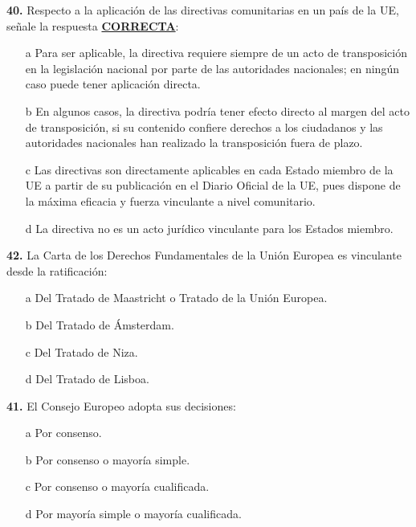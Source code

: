 \documentclass{nuevotema}
\begin{document}
\preguntas


\textbf{40.} Respecto a la aplicación de las directivas comunitarias en un país de la UE, señale la respuesta \underline{\textbf{CORRECTA}}:

\begin{itemize}
	\item[a] Para ser aplicable, la directiva requiere siempre de un acto de transposición en la legislación nacional por parte de las autoridades nacionales; en ningún caso puede tener aplicación directa.
	\item[b] En algunos casos, la directiva podría tener efecto directo al margen del acto de transposición, si su contenido confiere derechos a los ciudadanos y las autoridades nacionales han realizado la transposición fuera de plazo.
	\item[c] Las directivas son directamente aplicables en cada Estado miembro de la UE a partir de su publicación en el Diario Oficial de la UE, pues dispone de la máxima eficacia y fuerza vinculante a nivel comunitario.
	\item[d] La directiva no es un acto jurídico vinculante para los Estados miembro.
\end{itemize}

\bigskip
\textbf{42.} La Carta de los Derechos Fundamentales de la Unión Europea es vinculante desde la ratificación:

\begin{itemize}
	\item[a] Del Tratado de Maastricht o Tratado de la Unión Europea.
	\item[b] Del Tratado de Ámsterdam.
	\item[c] Del Tratado de Niza.
	\item[d] Del Tratado de Lisboa.
\end{itemize}


\textbf{41.} El Consejo Europeo adopta sus decisiones:

\begin{enumerate}
	\item[a] Por consenso.
	\item[b] Por consenso o mayoría simple.
	\item[c] Por consenso o mayoría cualificada.
	\item[d] Por mayoría simple o mayoría cualificada.
\end{enumerate}
\end{document}

